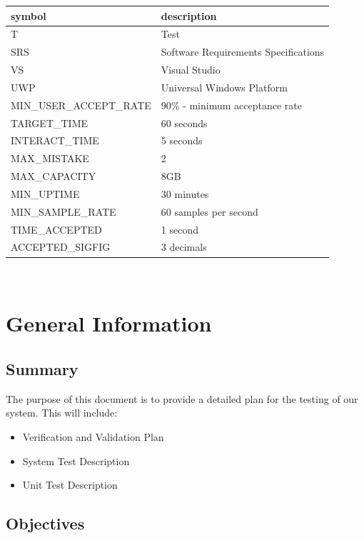 \documentclass[12pt, titlepage]{article}
\begin{document}
\renewcommand{\arraystretch}{1.2}
\begin{tabular}{l l} 
  \toprule		
  \textbf{symbol} & \textbf{description}\\
  \midrule 
  T & Test\\
  SRS & Software Requirements Specifications \\
  VS & Visual Studio\\
  UWP & Universal Windows Platform\\
  MIN\_USER\_ACCEPT\_RATE & 90\% - minimum acceptance rate\\
  TARGET\_TIME & 60 seconds \\
  INTERACT\_TIME & 5 seconds \\
  MAX\_MISTAKE & 2 \\
  MAX\_CAPACITY & 8GB \\ 
  MIN\_UPTIME & 30 minutes \\ 
  MIN\_SAMPLE\_RATE & 60 samples per second\\
  TIME\_ACCEPTED & 1 second \\
  ACCEPTED\_SIGFIG & 3 decimals \\
  \bottomrule
\end{tabular}\\


\newpage


\section{General Information}

\subsection{Summary}

The purpose of this document is to provide a detailed plan for the testing of our system. This will include:
\begin{itemize}
  \item Verification and Validation Plan
  \item System Test Description
  \item Unit Test Description
\end{itemize}

\subsection{Objectives}
\end{document}
